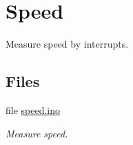 \hypertarget{group__speed}{}\section{Speed}
\label{group__speed}


Measure speed by interrupts.  


\subsection*{Files}
\begin{DoxyCompactItemize}
\item 
file \hyperlink{speed_8ino}{speed.\+ino}
\begin{DoxyCompactList}\small\item\em Measure speed. \end{DoxyCompactList}\end{DoxyCompactItemize}
